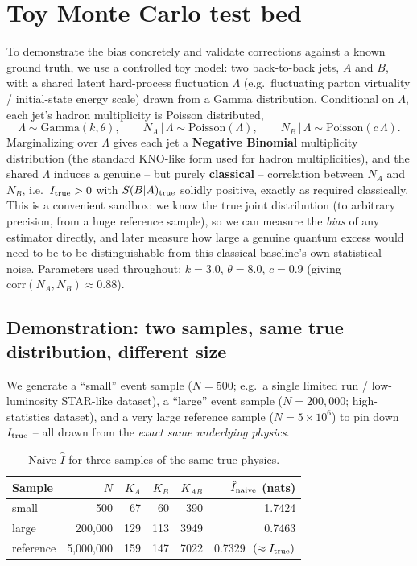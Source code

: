 \documentclass[11pt]{article}
\newcommand{\SBA}{S(B|A)}
\newcommand{\Itrue}{I_{\rm true}}
\begin{document}
\section{Toy Monte Carlo test bed}
\label{sec:toymc}

To demonstrate the bias concretely and validate corrections against a
known ground truth, we use a controlled toy model: two back-to-back jets,
$A$ and $B$, with a shared latent hard-process fluctuation $\Lambda$
(e.g.\ fluctuating parton virtuality / initial-state energy scale) drawn
from a Gamma distribution. Conditional on $\Lambda$, each jet's hadron
multiplicity is Poisson distributed,
\begin{equation}
\Lambda \sim \mathrm{Gamma}(k,\theta), \qquad
N_A\,|\,\Lambda \sim \mathrm{Poisson}(\Lambda), \qquad
N_B\,|\,\Lambda \sim \mathrm{Poisson}(c\,\Lambda).
\end{equation}
Marginalizing over $\Lambda$ gives each jet a \textbf{Negative Binomial}
multiplicity distribution (the standard KNO-like form used for hadron
multiplicities), and the shared $\Lambda$ induces a genuine -- but purely
\textbf{classical} -- correlation between $N_A$ and $N_B$, i.e.\
$\Itrue>0$ with $\SBA_{\rm true}$ solidly positive, exactly as required
classically. This is a convenient sandbox: we know the true joint
distribution (to arbitrary precision, from a huge reference sample), so we
can measure the \emph{bias} of any estimator directly, and later measure
how large a genuine quantum excess would need to be to be distinguishable
from this classical baseline's own statistical noise. Parameters used
throughout: $k=3.0$, $\theta=8.0$, $c=0.9$ (giving
$\mathrm{corr}(N_A,N_B)\approx 0.88$).

\subsection{Demonstration: two samples, same true distribution, different
size}

We generate a ``small'' event sample ($N=500$; e.g.\ a single limited run
/ low-luminosity STAR-like dataset), a ``large'' event sample
($N=200{,}000$; high-statistics dataset), and a very large reference
sample ($N=5\times10^6$) to pin down $\Itrue$ -- all drawn from the
\emph{exact same underlying physics}.

\begin{table}[h]
\centering
\caption{Naive $\hat I$ for three samples of the same true physics.}
\begin{tabular}{lrrrrr}
\toprule
Sample & $N$ & $K_A$ & $K_B$ & $K_{AB}$ & $\hat I_{\rm naive}$ (nats) \\
\midrule
small & 500 & 67 & 60 & 390 & 1.7424 \\
large & 200{,}000 & 129 & 113 & 3949 & 0.7463 \\
reference & 5{,}000{,}000 & 159 & 147 & 7022 & 0.7329 $\;(\approx \Itrue)$ \\
\bottomrule
\end{tabular}
\end{table}
\end{document}
